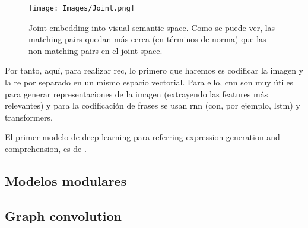 \begin{figure}[ht]
  \centering
  \texttt{[image: Images/Joint.png]}
  \caption[Joint embedding technique]{Joint embedding into visual-semantic
    space. Como se puede ver, las matching pairs quedan más cerca (en términos
    de norma) que las non-matching pairs en el joint space.}
  \label{fig:joint}
\end{figure}

Por tanto, aquí, para realizar \gls{rec}, lo primero que haremos es codificar
la imagen y la \gls{re} por separado en un mismo espacio vectorial. Para ello,
\gls{cnn} son muy útiles para generar representaciones de la imagen (extrayendo
las features más relevantes) y para la codificación de frases se usan \gls{rnn}
(con, por ejemplo, \gls{lstm}) y transformers.

El primer modelo de deep learning para referring expression generation and
comprehension, es de .

\subsection{Modelos modulares} \label{sec:modular}
\subsection{Graph convolution} \label{sec:graph}
